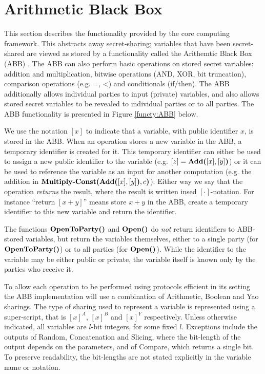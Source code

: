 \section{Arithmetic Black Box}
\label{sec:abb}

This section describes the functionality provided by the core computing framework.
This abstracts away secret-sharing; variables that have been secret-shared are viewed
as stored by a functionality called the Arithemtic Black Box (ABB) \cite{C:DamNie07}.
The ABB can also perform basic operations on stored secret variables:
addition and multiplication, bitwise operations (AND, XOR, bit truncation), 
comparison operations (e.g. =, <) and conditionals (if/then).
The ABB additionally allows individual parties to input (private) variables,
and also allows stored secret variables to be revealed to individual parties or to all parties.
The ABB functionality is presented in Figure \ref{functy:ABB} below.

We use the notation $[x]$ to indicate that a variable, with public identifier $x$,
is stored in the ABB.
When an operation stores a new variable in the ABB, 
a temporary identifier is created for it.
This temporary identifier can either be used to assign a new public identifier to
the variable (e.g. $[z] = \textbf{Add(}[x], [y]\textbf{)}$)
or it can be used to reference the variable as an input for another computation
(e.g. the addition in $\textbf{Multiply-Const(}\textbf{Add(}[x], [y]\textbf{)}, c\textbf{)}$).
Either way we say that the operation \emph{returns} the result,
where the result is written insed $[\cdot]$-notation.
For instance ``return $[x+y]$'' means store $x + y$ in the ABB,
create a temporary identifier to this new variable and return the identifier.

The functions $\textbf{OpenToParty()}$ and $\textbf{Open(}\textbf{)}$ do \emph{not} return identifiers
to ABB-stored variables, but return the variables themselves,
either to a single party (for $\textbf{OpenToParty()}$) or to all parties (for $\textbf{Open(}\textbf{)}$).
While the identifier to the variable may be either public or private,
the variable itself is known only by the parties who receive it.

To allow each operation to be performed using protocols efficient in its setting
the ABB implementation will use a combination of Arithmetic, Boolean and Yao sharings.
The type of sharing used to represent a variable is represented using a super-script,
that is $[x]^A$, $[x]^B$ and $[x]^Y$ respectively.
Unless otherwise indicated, all variables are $l$-bit integers, for some fixed $l$.
Exceptions include the outputs of Random, Concatenation and Slicing,
where the bit-length of the output depends on the parameters,
and of Compare, which returns a single bit.
To preserve readability, the bit-lengths are not stated explicitly
in the variable name or notation.

